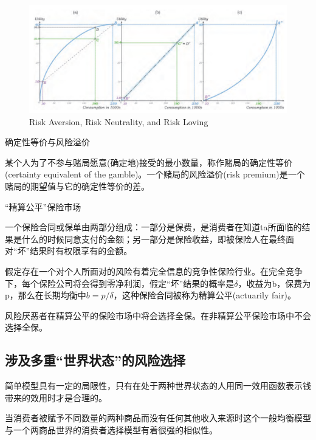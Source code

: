 \documentclass{article}
\begin{document}
\begin{figure}[H] %
	\centering %
	\includegraphics[width=1\textwidth]{17_2} %
	\caption{Risk Aversion, Risk Neutrality, and Risk Loving} %
	\label{Fig.main3} %
\end{figure}

\hspace*{\fill}

确定性等价与风险溢价

某个人为了不参与赌局愿意(确定地)接受的最小数量，称作赌局的确定性等价(certainty equivalent of the gamble)。一个赌局的风险溢价(risk premium)是一个赌局的期望值与它的确定性等价的差。

\hspace*{\fill}

“精算公平”保险市场

一个保险合同或保单由两部分组成：一部分是保费，是消费者在知道ta所面临的结果是什么的时候同意支付的金额；另一部分是保险收益，即被保险人在最终面对“坏”结果时有权限享有的金额。

假定存在一个对个人所面对的风险有着完全信息的竞争性保险行业。在完全竞争下，每个保险公司将会得到零净利润，假定“坏”结果的概率是$ \delta $，收益为b，保费为p，那么在长期均衡中$ b=p/\delta $，这种保险合同被称为精算公平(actuarily fair)。

风险厌恶者在精算公平的保险市场中将会选择全保。在非精算公平保险市场中不会选择全保。

\subsection{涉及多重“世界状态”的风险选择}

简单模型具有一定的局限性，只有在处于两种世界状态的人用同一效用函数表示钱带来的效用时才是合理的。

当消费者被赋予不同数量的两种商品而没有任何其他收入来源时这个一般均衡模型与一个两商品世界的消费者选择模型有着很强的相似性。
\end{document}

